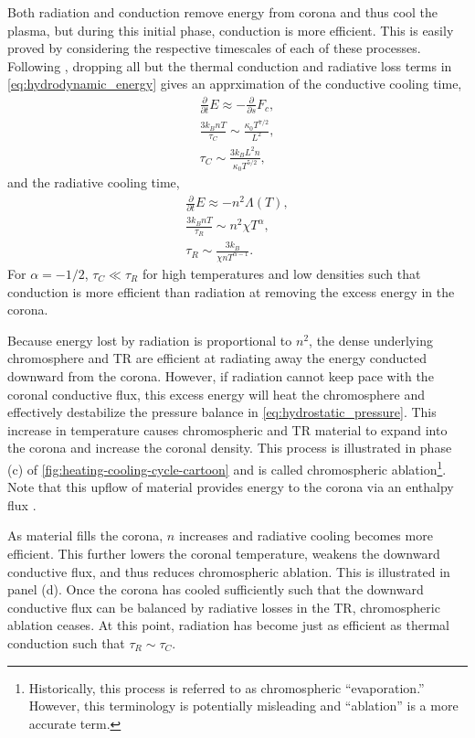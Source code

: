 Both radiation and conduction remove energy from corona and thus cool the plasma, but during this initial phase, conduction is more efficient. This is easily proved by considering the respective timescales of each of these processes. Following \citet{cargill_cooling_1995}, dropping all but the thermal conduction and radiative loss terms in \autoref{eq:hydrodynamic_energy} gives an apprximation of the conductive cooling time,
\begin{align}
    \frac{\partial}{\partial t}E \approx -\frac{\partial}{\partial s}F_c, \nonumber \\
    \frac{3k_BnT}{\tau_C} \sim \frac{\kappa_0 T^{7/2}}{L^2}, \nonumber \\
    \tau_C \sim \frac{3k_BL^2n}{\kappa_0T^{5/2}}, \label{eq:conductive_cooling_time}
\end{align} 
and the radiative cooling time,
\begin{align}
    \frac{\partial}{\partial t}E \approx -n^2\Lambda(T), \nonumber \\
    \frac{3k_BnT}{\tau_R} \sim n^2\chi T^\alpha, \nonumber \\
    \tau_R \sim \frac{3k_B}{\chi n T^{\alpha-1}}. \label{eq:radiative_cooling_time}
\end{align}
For $\alpha=-1/2$, $\tau_C \ll \tau_R$ for high temperatures and low densities such that conduction is more efficient than radiation at removing the excess energy in the corona. 

Because energy lost by radiation is proportional to $n^2$, the dense underlying chromosphere and TR are efficient at radiating away the energy conducted downward from the corona. However, if radiation cannot keep pace with the coronal conductive flux, this excess energy will heat the chromosphere and effectively destabilize the pressure balance in \autoref{eq:hydrostatic_pressure}. This increase in temperature causes chromospheric and TR \citep{bradshaw_influence_2013} material to expand into the corona and increase the coronal density. This process is illustrated in phase (c) of \autoref{fig:heating-cooling-cycle-cartoon} and is called chromospheric ablation\footnote{Historically, this process is referred to as chromospheric ``evaporation.'' However, this terminology is potentially misleading and ``ablation'' is a more accurate term.}. Note that this upflow of material provides energy to the corona via an enthalpy flux \citep{antiochos_evaporative_1978}.

As material fills the corona, $n$ increases and radiative cooling becomes more efficient. This further lowers the coronal temperature, weakens the downward conductive flux, and thus reduces chromospheric ablation. This is illustrated in panel (d). Once the corona has cooled sufficiently such that the downward conductive flux can be balanced by radiative losses in the TR, chromospheric ablation ceases. At this point, radiation has become just as efficient as thermal conduction such that $\tau_R\sim\tau_C$.

